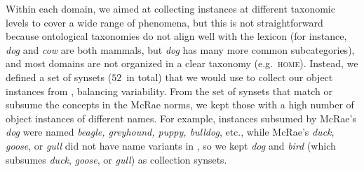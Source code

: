 Within each domain, we aimed at collecting instances at different taxonomic levels  to cover a wide range of phenomena, but this is not straightforward because ontological taxonomies do not align well with the lexicon (for instance, \textit{dog} and \textit{cow} are both mammals, but \textit{dog} has many more common subcategories), and most domains are not organized in a clear taxonomy %
(e.g.\ \textsc{home}).
Instead, we defined a set of synsets ($52$\ in total) that we would use to collect our object instances from \vg, balancing variability.
From the set of synsets that match or subsume the concepts in the McRae norms, we kept those with a high number of \vg object instances of different names.
For example, \vg instances subsumed by McRae's \textsl{dog} were named \textsl{beagle, greyhound, puppy, bulldog}, etc., while McRae's \textsl{duck}, \textsl{goose}, or \textsl{gull} did not have name variants in \vg, so we kept \textsl{dog} and \textsl{bird} (which subsumes \textsl{duck}, \textsl{goose}, or \textsl{gull}) as collection synsets.

